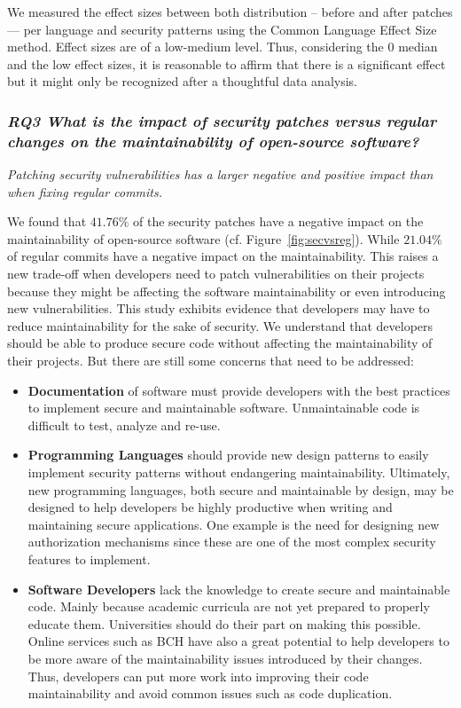 \documentclass[10pt,conference]{IEEEtran}
\begin{document}
We measured the effect sizes between both distribution -- before and after
patches --- per language and security patterns using the Common Language Effect
Size~\cite{cliff:1993} method. Effect sizes are of a low-medium level.
Thus, considering the $0$ median and the low effect sizes, it is reasonable
to affirm that there is a significant effect but it might only be
recognized after a thoughtful data analysis.


\subsubsection*{\textit{\textbf{RQ3} \textbf{What is the impact of security patches versus regular changes
on the maintainability of open-source software?}}}
\textit{Patching security vulnerabilities has a larger negative and positive impact
than when fixing regular commits.}

We found that $41.76\%$ of the security patches have a negative impact on the
maintainability of open-source software (cf. Figure~\ref{fig:secvsreg}). While $21.04\%$ of regular commits have a negative impact on the maintainability. This raises
a new trade-off when developers need to patch vulnerabilities on their projects
because they might be affecting the software maintainability or even introducing
new vulnerabilities. This study exhibits evidence that developers may have to
reduce maintainability for the sake of security. We understand that developers
should be able to produce secure code without affecting the maintainability of
their projects. But there are still some concerns that need to be addressed:
\begin{itemize}
	\item \textbf{Documentation} of software must provide developers with the
	best practices to implement secure and maintainable software. Unmaintainable
	code is difficult to test, analyze and re-use.

	\item\textbf{Programming Languages} should provide new design patterns to
	easily implement security patterns without endangering maintainability.
	Ultimately, new programming languages, both secure and maintainable by design,
	may be designed to help developers be highly productive when writing and
	maintaining  secure applications. One example is the need for designing new
	authorization mechanisms since these are one of the most complex security
	features to implement.

	\item \textbf{Software Developers} lack the knowledge to create secure and
	maintainable code. Mainly because academic curricula are not yet prepared
	to properly educate them. Universities should do their part on making
	this possible. Online services such as BCH have also a great potential to help
	developers to be more aware of the maintainability issues introduced by their
	changes. Thus, developers can put more work into improving their code maintainability
	and avoid common issues such as code duplication.

\end{itemize}
\end{document}
